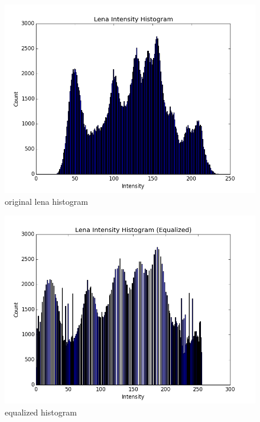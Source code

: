 \documentclass[12pt,twoside,a4paper]{article}
\begin{document}
\begin{figure}[H]
\centering
\includegraphics[scale=0.7]{lena-histogram.png}
\caption{original lena histogram}
\label{fig:lena-histogram.png}
\end{figure}

\begin{figure}[H]
\centering
\includegraphics[scale=0.7]{equalized-histogram.png}
\caption{equalized histogram}
\label{fig:equalized-histogram.png}
\end{figure}
\end{document}
